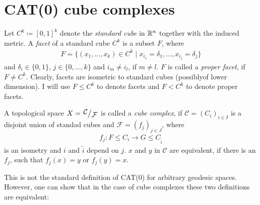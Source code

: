 
\section{CAT(0) cube complexes}
\label{sec:complexes}


\begin{defin}
  Let \(C^k \coloneqq {[0,1]}^k\) denote the \emph{standard cube} in \(\mathbb{R}^n\) together with the induced metric. A \emph{facet} of a standard cube \(C^k\) is a subset \(F\), where
  \begin{align*}
    F = \{(x_1, \dots, x_k) \in C^k \mid x_{i_1} = \delta_1, \dots, x_{i_j}  = \delta_j\}
  \end{align*}
  and \(\delta_i \in \{0, 1\}\), \(j \in \{0, \dots, k\}\) and \(i_m \neq i_l\), if \(m \neq l\). \(F\) is called a \emph{proper facet}, if \(F \neq C^k\). Clearly, facets are isometric to standard cubes (possiblyof lower dimension). I will use \(F \leq C^k\) to denote facets and \(F < C^k\) to denote proper facets.
  
  A topological space \(X = \quot{\mathcal{C}}{\mathcal{F}}\) is called a \emph{cube complex}, if \(\mathcal{C} = {(C_i)}_{i \in I}\) is a disjoint union of standad cubes and \(\mathcal{F} = {(f_j)}_{j \in J}\), where
  \begin{align*}
    f_j\colon F \leq C_i \to G \leq C_{\tilde i}
  \end{align*}
  is an isometry and \(i\) and \(\tilde i\) depend on \(j\). \(x\) and \(y\) in \(\mathcal{C}\) are equivalent, if there is an \(f_j\), such that \(f_j(x) = y\) or \(f_j(y) = x\).
\end{defin}

\begin{bsp}
\end{bsp}

\begin{defin}[Link]
  
\end{defin}

\begin{defin}
  
\end{defin}

\begin{defin}
  
\end{defin}

\begin{rem}
  This is not the standard definition of CAT(0) for arbitrary geodesic spaces. However, one can show that in the case of cube complexes these two definitions are equivalent:
\end{rem}

\begin{thm}
  
\end{thm}

